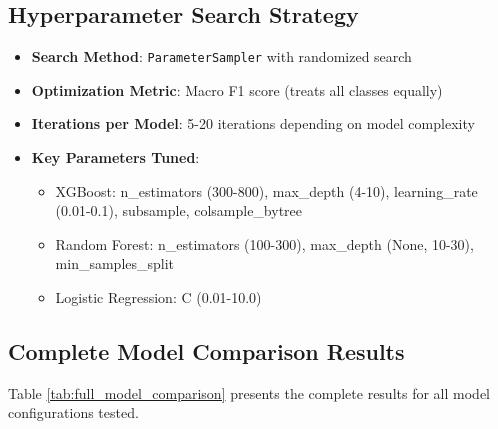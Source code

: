 \documentclass[12pt, a4paper]{article}
\begin{document}
\subsection{Hyperparameter Search Strategy}
\begin{itemize}
    \item \textbf{Search Method}: \texttt{ParameterSampler} with randomized search
    \item \textbf{Optimization Metric}: Macro F1 score (treats all classes equally)
    \item \textbf{Iterations per Model}: 5-20 iterations depending on model complexity
    \item \textbf{Key Parameters Tuned}:
    \begin{itemize}
        \item XGBoost: n\_estimators (300-800), max\_depth (4-10), learning\_rate (0.01-0.1), subsample, colsample\_bytree
        \item Random Forest: n\_estimators (100-300), max\_depth (None, 10-30), min\_samples\_split
        \item Logistic Regression: C (0.01-10.0)
    \end{itemize}
\end{itemize}

\subsection{Complete Model Comparison Results}
Table \ref{tab:full_model_comparison} presents the complete results for all model configurations tested.
\end{document}
